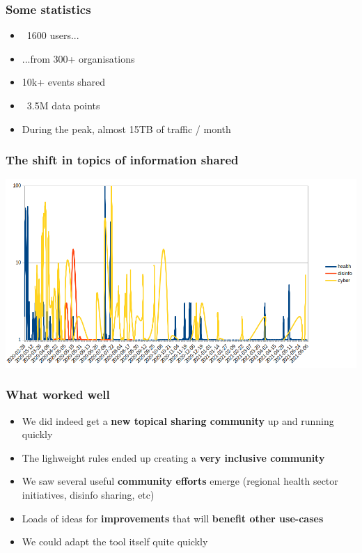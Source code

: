 \begin{frame}
 \frametitle{Some statistics}
 \begin{itemize}
         \item ~1600 users...
         \item ...from 300+ organisations
         \item 10k+ events shared
         \item ~3.5M data points
         \item During the peak, almost 15TB of traffic / month
 \end{itemize}
\end{frame}

\begin{frame}
 \frametitle{The shift in topics of information shared}
 \includegraphics[width=1.00\linewidth]{topics_of_sharing_daily.png}
\end{frame}

\begin{frame}
 \frametitle{What worked well}
 \begin{itemize}
         \item We did indeed get a {\bf new topical sharing community} up and running quickly
         \item The lighweight rules ended up creating a {\bf very inclusive community}
         \item We saw several useful {\bf community efforts} emerge (regional health sector initiatives, disinfo sharing, etc)
         \item Loads of ideas for {\bf improvements} that will {\bf benefit other use-cases}
         \item We could adapt the tool itself quite quickly
 \end{itemize}
\end{frame}

